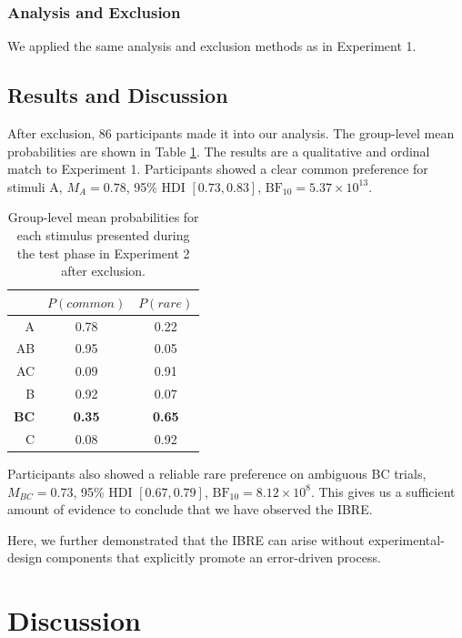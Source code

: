 \documentclass[10pt,letterpaper]{article}
\begin{document}
\subsubsection{Analysis and Exclusion}

We applied the same analysis and exclusion methods as in Experiment 1.

\subsection{Results and Discussion}

After exclusion, 86 participants made it into our analysis.
The group-level mean probabilities are shown in Table \ref{tab:results-exp2}.
The results are a qualitative and ordinal match to Experiment 1.
Participants showed a clear common preference for stimuli A, $M_{A} = 0.78$, 95\% HDI $[0.73, 0.83]$, $\mathrm{BF}_{10} = 5.37 \times 10^{13}$.

\begin{table}[H]
  \begin{center}
    \caption{Group-level mean probabilities for each stimulus presented during the test phase in Experiment 2 after exclusion.\\}
    \label{tab:results-exp2}
    \vskip 0.12in
    \begin{tabular}{rcc}
      \hline
       & $P(common)$ & $P(rare)$ \\
      \hline
      A & 0.78 & 0.22  \\
      AB & 0.95 & 0.05 \\
      AC & 0.09 & 0.91 \\
      B & 0.92 & 0.07  \\
      \textbf{BC} & \textbf{0.35} & \textbf{0.65} \\
      C & 0.08 & 0.92 \\
    \end{tabular}
  \end{center}
\end{table}

Participants also showed a reliable rare preference on ambiguous BC trials, $M_{BC} = 0.73$, 95\% HDI $[0.67, 0.79]$, $\mathrm{BF}_{10} = 8.12 \times 10^{8}$.
This gives us a sufficient amount of evidence to conclude that we have observed the IBRE.

Here, we further demonstrated that the IBRE can arise without experimental-design components that explicitly promote an error-driven process.

\section{Discussion}
\end{document}
